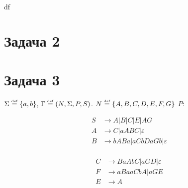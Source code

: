 \documentclass[a4paper]{article}
\def\eps{\varepsilon}
\def\eqdef{\overset{\mbox{\tiny def}}{=}}
\begin{document}
{\fontsize{400}{1} df}
\section*{Задача 2}
\section*{Задача 3}
$\Sigma\eqdef\{a,b\}$, $\Gamma\eqdef(N,\Sigma,P,S)$. $N\eqdef\{A,B,C,D,E,F,G\}$ $P:$
\vspace{-7ex}
\begin{multicols}{2}
	\begin{align*}
		S &\to A|B|C|E|AG \\
		A &\to C |aABC|\eps\\
		B &\to bABa|aCbDaGb|\eps\\
	\end{align*}

	\begin{align*}
		C &\to BaAbC|aGD|\eps\\
		F &\to aBaaCbA|aGE\\
		E &\to A\\			
	\end{align*}	
\end{multicols}
\vspace{-7ex}
\end{document}
